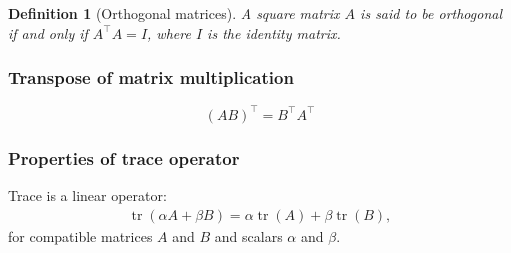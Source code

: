 \documentclass{article}
\newtheorem{defn}{Definition}
\DeclareMathOperator{\tr}{tr}
\begin{document}
\begin{defn}[Orthogonal matrices]
  A square matrix $A$ is said to be orthogonal if and only if $A^\top A = I$, where $I$ is the identity matrix.
\end{defn}

\subsubsection{Transpose of matrix multiplication}
\[
  (AB)^\top = B^\top A^\top
  \]

\subsubsection{Properties of trace  operator}
Trace is a linear operator:
\begin{align}
  \tr(\alpha A  +  \beta B) = \alpha \tr(A) +  \beta \tr(B),
\end{align}
for compatible matrices  $A$ and $B$   and scalars $\alpha$ and $\beta$.
\end{document}
